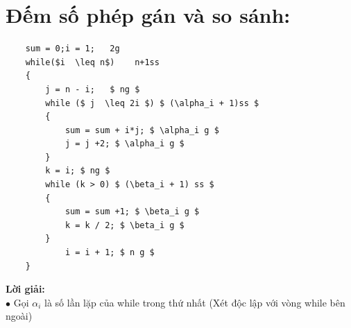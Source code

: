 \documentclass[12pt, letterpaper]{article}
\begin{document}
\section{Đếm số phép gán và so sánh:}
\begin{lstlisting}
	sum = 0;i = 1;   2g
	while($i  \leq n$)    n+1ss 
	{    
		j = n - i;   $ ng $
		while ($ j  \leq 2i $) $ (\alpha_i + 1)ss $
		{
			sum = sum + i*j; $ \alpha_i g $
			j = j +2; $ \alpha_i g $		
		}
		k = i; $ ng $
		while (k > 0) $ (\beta_i + 1) ss $
		{
			sum = sum +1; $ \beta_i g $
			k = k / 2; $ \beta_i g $
		}
			i = i + 1; $ n g $
	}
	\end{lstlisting}
	\textbf{Lời giải:} \\
	$\bullet$ Gọi $\alpha_i$ là số lần lặp của while trong thứ nhất (Xét độc lập với vòng while bên ngoài)\\
\end{document}
